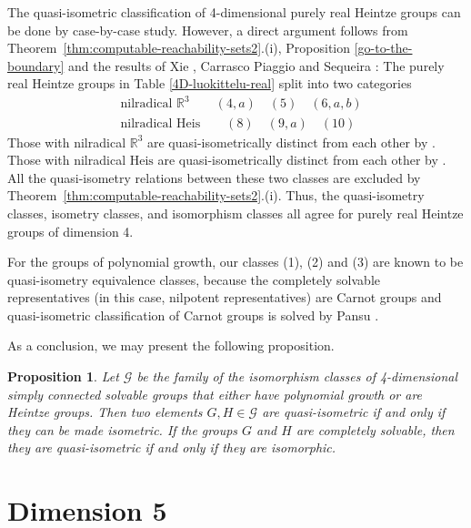 \documentclass[a4paper,12pt]{amsart}
\newcommand{\pp}{\mathrm}
\theoremstyle{plain}
\theoremstyle{definition}
\theoremstyle{plain}
\newtheorem{prop}[maar]{Proposition}
\theoremstyle{remark}
\begin{document}
The quasi-isometric classification of 4-dimensional purely real Heintze groups can be done by case-by-case study.
However, a direct argument follows from Theorem~\ref{thm:computable-reachability-sets2}.(i), Proposition \ref{go-to-the-boundary} and the results of Xie \cite{MR3180486}, Carrasco Piaggio and Sequeira \cite[Theorem 1.3]{avain:CPS}: The purely real Heintze groups in Table \ref{4D-luokittelu-real} split into two categories
\begin{align*}
&\text{nilradical } \mathbb{R}^3 \qquad (4,a) \quad (5) \quad (6,a,b)
\\
&\text{nilradical } \pp{Heis} \qquad (8) \quad (9,a) \quad (10)
\end{align*}
Those with nilradical \( \mathbb{R}^3 \) are quasi-isometrically distinct from each other by \cite{MR3180486}. Those with nilradical \( \pp{Heis} \) are quasi-isometrically distinct from each other by \cite[Theorem 1.3]{avain:CPS}. All the quasi-isometry relations between these two classes are excluded by Theorem~\ref{thm:computable-reachability-sets2}.(i). Thus, the quasi-isometry classes, isometry classes, and isomorphism classes all agree for purely real Heintze groups of dimension 4.



For the groups of polynomial growth,
our classes (1), (2) and (3) are known to be quasi-isometry equivalence classes, because the completely solvable representatives (in this case, nilpotent representatives) are Carnot groups and quasi-isometric classification of Carnot groups is solved by Pansu \cite{pansu}. 

As a conclusion, we may present the following proposition.
\begin{prop}
	Let \( \mathcal{G} \) be the family of the isomorphism classes of 4-dimensional simply connected solvable groups that either have polynomial growth or are Heintze groups. Then two elements \( G,H \in   \mathcal{G} \) are quasi-isometric if and only if they can be made isometric. If the groups \( G \) and \( H \) are completely solvable, then they are quasi-isometric if and only if they are isomorphic.
\end{prop}






\section{Dimension 5}
\end{document}
